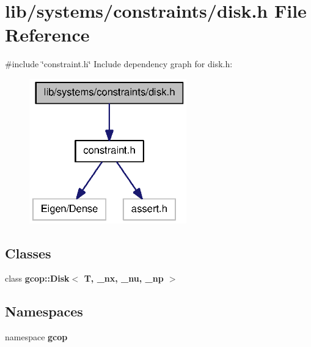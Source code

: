 \section{lib/systems/constraints/disk.h \-File \-Reference}
\label{disk_8h}
{\ttfamily \#include \char`\"{}constraint.\-h\char`\"{}}\*
\-Include dependency graph for disk.\-h\-:\nopagebreak
\begin{figure}[H]
\begin{center}
\leavevmode
\includegraphics[width=193pt]{disk_8h__incl}
\end{center}
\end{figure}
\subsection*{\-Classes}
\begin{DoxyCompactItemize}
\item 
class {\bf gcop\-::\-Disk$<$ T, \-\_\-nx, \-\_\-nu, \-\_\-np $>$}
\end{DoxyCompactItemize}
\subsection*{\-Namespaces}
\begin{DoxyCompactItemize}
\item 
namespace {\bf gcop}
\end{DoxyCompactItemize}
